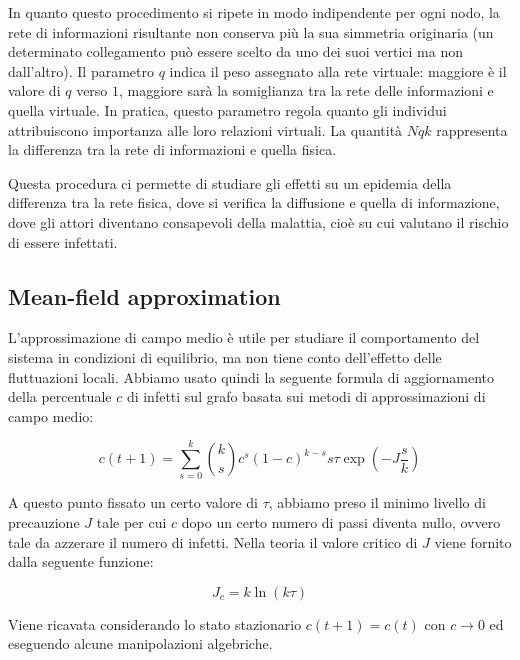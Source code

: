 In quanto questo procedimento si ripete in modo indipendente per ogni nodo, la rete di informazioni risultante non
conserva più la sua simmetria originaria (un determinato collegamento può essere scelto da uno dei suoi vertici ma non dall'altro).
Il parametro $q$ indica il peso assegnato alla rete virtuale: maggiore è il valore di $q$ verso $1$, maggiore sarà la
somiglianza tra la rete delle informazioni e quella virtuale.
In pratica, questo parametro regola quanto gli individui attribuiscono importanza alle loro relazioni virtuali.
La quantità $Nqk$ rappresenta la differenza tra la rete di informazioni e quella fisica.

Questa procedura ci permette di studiare gli effetti su un epidemia della differenza tra la rete fisica, dove si verifica la
diffusione e quella di informazione, dove gli attori diventano consapevoli della malattia,
cioè su cui valutano il rischio di essere infettati.

\subsection{Mean-field approximation}\label{subsec:mean-field-approximation}
L'approssimazione di campo medio è utile per studiare il comportamento del sistema in condizioni di
equilibrio, ma non tiene conto dell'effetto delle fluttuazioni locali.
Abbiamo usato quindi la seguente formula di aggiornamento della percentuale $c$ di infetti sul grafo basata
sui metodi di approssimazioni di campo medio:

\begin{equation}
    c(t+1)=\sum_{s=0}^{k}\binom{k}{s}c^{s}(1-c)^{k-s}s\tau\exp\left(-J\frac{s}{k}\right)\label{eq:mean-field}
\end{equation}

A questo punto fissato un certo valore di $\tau$, abbiamo preso il minimo livello di precauzione $J$ tale per cui $c$ dopo un
certo numero di passi diventa nullo, ovvero tale da azzerare il numero di infetti. 
Nella teoria il valore critico di $J$ viene fornito dalla seguente funzione:

\begin{equation}
    J_{c}=k\ln(k\tau)\label{eq:mean-field-critical}
\end{equation}

Viene ricavata considerando lo stato stazionario $c(t+1)=c(t)$ con $c\to0$ ed eseguendo alcune manipolazioni algebriche.

